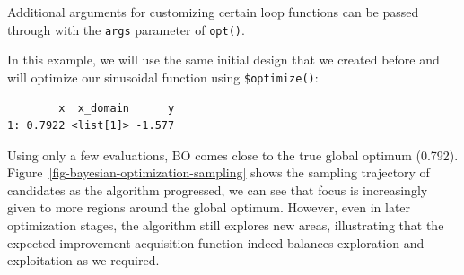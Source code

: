 \begin{tcolorbox}[enhanced jigsaw, opacitybacktitle=0.6, rightrule=.15mm, opacityback=0, arc=.35mm, breakable, titlerule=0mm, colframe=quarto-callout-tip-color-frame, coltitle=black, bottomrule=.15mm, toprule=.15mm, colback=white, colbacktitle=quarto-callout-tip-color!10!white, bottomtitle=1mm, toptitle=1mm, title=\textcolor{quarto-callout-tip-color}{\faLightbulb}\hspace{0.5em}{Loop Function Arguments}, leftrule=.75mm, left=2mm]

Additional arguments for customizing certain loop functions can be
passed through with the \texttt{args} parameter of \texttt{opt()}.

\end{tcolorbox}

In this example, we will use the same initial design that we created
before and will optimize our sinusoidal function using
\texttt{\$optimize()}:

\begin{Shaded}
\begin{Highlighting}[]
\OtherTok{=}\SpecialCharTok{$}
   \NormalTok{(}\NormalTok{, } \NormalTok{))}
\OtherTok{=} \NormalTok{(} \NormalTok{(}\NormalTok{, }\NormalTok{, }\NormalTok{, }\NormalTok{))}
\SpecialCharTok{$}
\SpecialCharTok{$}
\end{Highlighting}
\end{Shaded}

\begin{verbatim}
        x  x_domain      y
1: 0.7922 <list[1]> -1.577
\end{verbatim}

Using only a few evaluations, BO comes close to the true global optimum
(0.792). Figure~\ref{fig-bayesian-optimization-sampling} shows the
sampling trajectory of candidates as the algorithm progressed, we can
see that focus is increasingly given to more regions around the global
optimum. However, even in later optimization stages, the algorithm still
explores new areas, illustrating that the expected improvement
acquisition function indeed balances exploration and exploitation as we
required.

